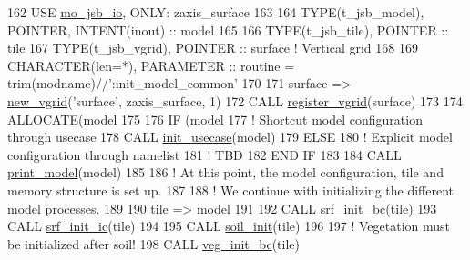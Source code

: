 \begin{DoxyCode}
162     \textcolor{keywordtype}{USE }\hyperlink{namespacemo__jsb__io}{mo\_jsb\_io}\textcolor{keywordtype}{,            ONLY}: zaxis\_surface
163 
164     \textcolor{keywordtype}{TYPE}(t\_jsb\_model), \textcolor{keywordtype}{POINTER}, \textcolor{keywordtype}{INTENT(inout)} :: model
165 
166     \textcolor{keywordtype}{TYPE}(t\_jsb\_tile),  \textcolor{keywordtype}{POINTER} :: tile
167     \textcolor{keywordtype}{TYPE}(t\_jsb\_vgrid), \textcolor{keywordtype}{POINTER} :: surface                      \textcolor{comment}{! Vertical grid}
168 
169     \textcolor{keywordtype}{CHARACTER(len=*)}, \textcolor{keywordtype}{PARAMETER} :: routine = trim(modname)//\textcolor{stringliteral}{':init\_model\_common'}
170 
171     surface => \hyperlink{namespacemo__jsb__grid__class_a9b97575796bec8269c7381e0ffedd2d8}{new\_vgrid}(\textcolor{stringliteral}{'surface'}, zaxis\_surface, 1)
172     \textcolor{keyword}{CALL }\hyperlink{namespacemo__jsb__grid_a043909fe2d80d058e59831341f25fdab}{register\_vgrid}(surface)
173 
174     \textcolor{keyword}{ALLOCATE}(model%
175 
176     \textcolor{keywordflow}{IF} (model%
177       \textcolor{comment}{! Shortcut model configuration through usecase}
178       \textcolor{keyword}{CALL }\hyperlink{namespacemo__jsb__model__usecases_aee8b30e4af60fbe54276c99ea4ee1fd1}{init\_usecase}(model)
179     \textcolor{keywordflow}{ELSE}
180       \textcolor{comment}{! Explicit model configuration through namelist}
181       \textcolor{comment}{! TBD}
182 \textcolor{keywordflow}{    END IF}
183 
184     \textcolor{keyword}{CALL }\hyperlink{namespacemo__jsb__model__class_aeff5c6eb74d03881233ad31085269d5e}{print\_model}(model)
185 
186     \textcolor{comment}{! At this point, the model configuration, tile and memory structure is set up.}
187 
188     \textcolor{comment}{! We continue with initializing the different model processes.}
189 
190     tile => model%
191 
192     \textcolor{keyword}{CALL }\hyperlink{namespacemo__srf__init_a7c44e1a5211e8f4702bfd3724031f8d7}{srf\_init\_bc}(tile)
193     \textcolor{keyword}{CALL }\hyperlink{namespacemo__srf__init_a7991eb826bda9d166a7e59489d44ea9b}{srf\_init\_ic}(tile)
194 
195     \textcolor{keyword}{CALL }\hyperlink{namespacemo__soil__init_acd283c148fd4faca32050c04a10218a3}{soil\_init}(tile)
196 
197     \textcolor{comment}{! Vegetation must be initialized after soil!}
198     \textcolor{keyword}{CALL }\hyperlink{namespacemo__veg__init_a51acdbb676d276054d328e045605f688}{veg\_init\_bc}(tile)

\end{DoxyCode}
